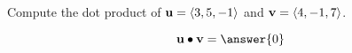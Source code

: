 \documentclass{ximera}
\author{Gregory Hartman \and Matthew Carr}
\begin{document}
\begin{exercise}




Compute the dot product of $\mathbf{u}=\left\langle 3,5,-1\right\rangle$ and $\mathbf{v}=\left\langle 4,-1,7\right\rangle$.

\begin{prompt}
\[
\vec{u}\dotp\vec{v}=\answer{0}
\]
\end{prompt}

\end{exercise}
\end{document}
